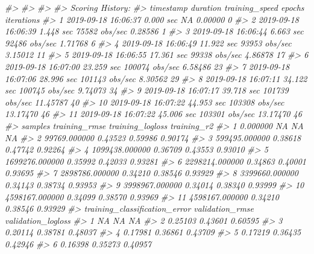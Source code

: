 \documentclass[]{book}
\newenvironment{Shaded}{\begin{snugshade}}{\end{snugshade}}
\newcommand{\CommentTok}[1]{\textcolor[rgb]{0.56,0.35,0.01}{\textit{#1}}}
\begin{document}
\begin{Shaded}
\begin{Highlighting}[]
{{{{{{\CommentTok{#> }
\CommentTok{#> }
\CommentTok{#> }
\CommentTok{#> Scoring History: }
\CommentTok{#>              timestamp   duration training_speed   epochs iterations}
\CommentTok{#> 1  2019-09-18 16:06:37  0.000 sec             NA  0.00000          0}
\CommentTok{#> 2  2019-09-18 16:06:39  1.448 sec  75582 obs/sec  0.28586          1}
\CommentTok{#> 3  2019-09-18 16:06:44  6.663 sec  92486 obs/sec  1.71768          6}
\CommentTok{#> 4  2019-09-18 16:06:49 11.922 sec  93953 obs/sec  3.15012         11}
\CommentTok{#> 5  2019-09-18 16:06:55 17.361 sec  99338 obs/sec  4.86878         17}
\CommentTok{#> 6  2019-09-18 16:07:00 23.259 sec 100074 obs/sec  6.58486         23}
\CommentTok{#> 7  2019-09-18 16:07:06 28.996 sec 101143 obs/sec  8.30562         29}
\CommentTok{#> 8  2019-09-18 16:07:11 34.122 sec 100745 obs/sec  9.74073         34}
\CommentTok{#> 9  2019-09-18 16:07:17 39.718 sec 101739 obs/sec 11.45787         40}
\CommentTok{#> 10 2019-09-18 16:07:22 44.953 sec 103308 obs/sec 13.17470         46}
\CommentTok{#> 11 2019-09-18 16:07:22 45.006 sec 103301 obs/sec 13.17470         46}
\CommentTok{#>           samples training_rmse training_logloss training_r2}
\CommentTok{#> 1        0.000000            NA               NA          NA}
\CommentTok{#> 2    99769.000000       0.43523          0.59986     0.90174}
\CommentTok{#> 3   599495.000000       0.38618          0.47742     0.92264}
\CommentTok{#> 4  1099438.000000       0.36709          0.43553     0.93010}
\CommentTok{#> 5  1699276.000000       0.35992          0.42033     0.93281}
\CommentTok{#> 6  2298214.000000       0.34863          0.40001     0.93695}
\CommentTok{#> 7  2898786.000000       0.34210          0.38546     0.93929}
\CommentTok{#> 8  3399660.000000       0.34143          0.38734     0.93953}
\CommentTok{#> 9  3998967.000000       0.34014          0.38340     0.93999}
\CommentTok{#> 10 4598167.000000       0.34099          0.38570     0.93969}
\CommentTok{#> 11 4598167.000000       0.34210          0.38546     0.93929}
\CommentTok{#>    training_classification_error validation_rmse validation_logloss}
\CommentTok{#> 1                             NA              NA                 NA}
\CommentTok{#> 2                        0.25103         0.43601            0.60595}
\CommentTok{#> 3                        0.20114         0.38781            0.48037}
\CommentTok{#> 4                        0.17981         0.36861            0.43709}
\CommentTok{#> 5                        0.17219         0.36435            0.42946}
\CommentTok{#> 6                        0.16398         0.35273            0.40957}
}}}}}}
\end{Highlighting}
\end{Shaded}
\end{document}
